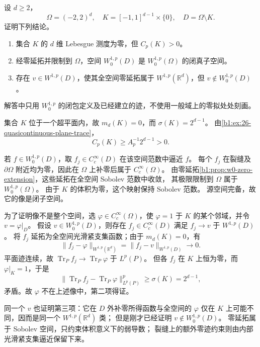 \begin{exercise}\label{b1:ex:26-slit-zero-boundary-space}
设 \(d\ge2\)，
\[
 \Omega=(-2,2)^d,\quad
 K=[-1,1]^{d-1}\times\{0\},\quad D=\Omega\setminus K.
\]
证明下列结论。
\begin{enumerate}
 \item\label{b1:item:26-slit-positive-capacity}
 集合 \(K\) 的 \(d\) 维 Lebesgue 测度为零，但 \(C_p(K)>0\)。
 \item\label{b1:item:26-slit-strict-w0}
 经零延拓并限制到 \(\Omega\)，空间 \(W_0^{1,p}(D)\) 是
 \(W_0^{1,p}(\Omega)\) 的闭真子空间。
 \item\label{b1:item:26-slit-zero-extension-insufficient}
 存在 \(v\in W^{1,p}(D)\)，使其全空间零延拓属于
 \(W^{1,p}(\mathbb R^d)\)，但 \(v\notin W_0^{1,p}(D)\)。
\end{enumerate}
解答中只用 \(W_0^{1,p}\) 的闭包定义及已经建立的迹，不使用一般域上的零拟处处刻画。
\end{exercise}
\begin{solution}
集合 \(K\) 位于一个超平面内，故 \(m_d(K)=0\)，而
\(\sigma(K)=2^{d-1}\)。
由\cref{b1:ex:26-quasicontinuous-plane-trace}，
\[
 C_p(K)\ge A_p^{-1}2^{d-1}>0.
\]

若 \(f\in W_0^{1,p}(D)\)，取 \(f_j\in C_c^\infty(D)\) 在该空间范数中逼近 \(f\)。
每个 \(f_j\) 在裂缝及 \(\partial\Omega\) 附近均为零，因此在 \(\Omega\) 上补零后属于
\(C_c^\infty(\Omega)\)。
由零延拓\cref{b1:prop:w0-zero-extension}，这些延拓在全空间 Sobolev 范数中收敛，
其极限限制到 \(\Omega\) 属于 \(W_0^{1,p}(\Omega)\)。
由于 \(K\) 的体积为零，这个映射保持 Sobolev 范数。
源空间完备，故它的像是闭子空间。

为了证明像不是整个空间，选 \(\varphi\in C_c^\infty(\Omega)\)，使
\(\varphi=1\) 于 \(K\) 的某个邻域，并令 \(v=\varphi|_D\)。
假设 \(v\in W_0^{1,p}(D)\)，则存在 \(f_j\in C_c^\infty(D)\) 满足
\(f_j\to v\) 于 \(W^{1,p}(D)\)。
将 \(f_j\) 延拓为全空间光滑紧支集函数；由于 \(m_d(K)=0\)，有
\[
 \|f_j-\varphi\|_{W^{1,p}(\mathbb R^d)}
       =\|f_j-v\|_{W^{1,p}(D)}\longrightarrow0.
\]
平面迹连续，故 \(\operatorname{Tr}_P f_j\to\operatorname{Tr}_P\varphi\) 于 \(L^p(P)\)。
但各 \(f_j\) 在 \(K\) 上恒为零，而 \(\varphi|_K=1\)，于是
\[
 \|\operatorname{Tr}_P f_j-\operatorname{Tr}_P\varphi\|_{L^p(P)}^p
       \ge \sigma(K)=2^{d-1},
\]
矛盾。故 \(\varphi\) 不在上述像中，第二项得证。

同一个 \(v\) 也证明第三项：它在 \(D\) 外补零所得函数与全空间的
\(\varphi\) 仅在 \(K\) 上可能不同，因而是同一个 \(W^{1,p}(\mathbb R^d)\) 类；
但是刚才已经证明 \(v\notin W_0^{1,p}(D)\)。
零延拓属于 Sobolev 空间，只约束体积意义下的弱导数；
裂缝上的额外零迹约束则由内部光滑紧支集逼近保留下来。
\end{solution}
